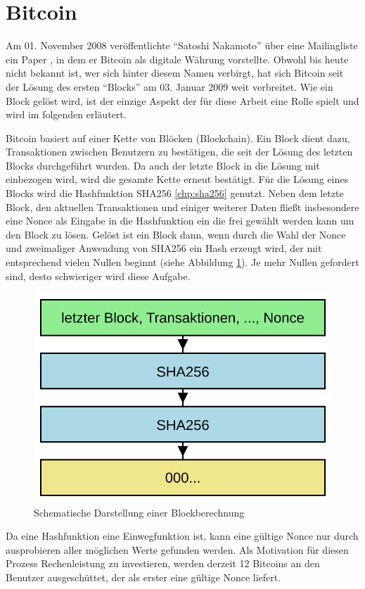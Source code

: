 \section{Bitcoin}
\label{sec:bitcoin}

Am 01. November 2008 veröffentlichte "`Satoshi Nakamoto"' über eine Mailingliste \cite{bitcoinmailinglist} ein Paper \cite{bitcoinpaper}, in dem
er Bitcoin als digitale Währung vorstellte. Obwohl bis heute nicht bekannt ist, wer sich hinter diesem Namen verbirgt, hat sich Bitcoin seit der
Lösung des ersten "`Blocks"' am 03. Januar 2009 \cite{bitcoinblock0} weit verbreitet. Wie ein Block gelöst wird, ist der einzige Aspekt der für
diese Arbeit eine Rolle spielt und wird im folgenden erläutert.

Bitcoin basiert auf einer Kette von Blöcken (Blockchain). Ein Block dient dazu, Transaktionen zwischen Benutzern zu bestätigen, die seit der Lösung
des letzten Blocks durchgeführt wurden. Da auch der letzte Block in die Lösung mit einbezogen wird, wird die gesamte Kette erneut bestätigt.
Für die Lösung eines Blocks wird die Hashfunktion SHA256 \ref{chp:sha256} genutzt. Neben dem letzte Block, den aktuellen Transaktionen und einiger
weiterer Daten fließt insbesondere eine Nonce als Eingabe in die Hashfunktion ein die frei gewählt werden kann um den Block zu lösen. Gelöst ist ein
Block dann, wenn durch die Wahl der Nonce und zweimaliger Anwendung von SHA256 ein Hash erzeugt wird, der mit entsprechend vielen Nullen beginnt
(siehe Abbildung \ref{fig:bitcoin}). Je mehr Nullen gefordert sind, desto schwieriger wird diese Aufgabe.

\begin{figure}[!h]
  \centering
  \includegraphics[scale=0.4]{images/bitcoin}
  \caption{Schematische Darstellung einer Blockberechnung}
  \label{fig:bitcoin}
\end{figure}

Da eine Hashfunktion eine Einwegfunktion ist, kann eine gültige Nonce nur durch ausprobieren aller möglichen Werte gefunden werden. Als Motivation
für diesen Prozess Rechenleistung zu investieren, werden derzeit 12 Bitcoins an den Benutzer ausgeschüttet, der als erster eine gültige Nonce liefert.



